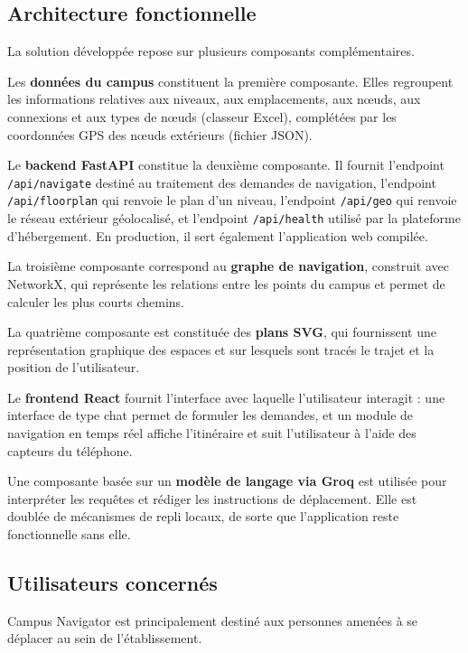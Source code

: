 \documentclass[12pt,a4paper]{report}
\begin{document}
\subsection{Architecture fonctionnelle}

La solution développée repose sur plusieurs composants complémentaires.

Les \textbf{données du campus} constituent la première composante. Elles regroupent les
informations relatives aux niveaux, aux emplacements, aux nœuds, aux connexions et aux types de
nœuds (classeur Excel), complétées par les coordonnées GPS des nœuds extérieurs (fichier JSON).

Le \textbf{backend FastAPI} constitue la deuxième composante. Il fournit l'endpoint
\texttt{/api/navigate} destiné au traitement des demandes de navigation, l'endpoint
\texttt{/api/floorplan} qui renvoie le plan d'un niveau, l'endpoint \texttt{/api/geo} qui
renvoie le réseau extérieur géolocalisé, et l'endpoint \texttt{/api/health} utilisé par la
plateforme d'hébergement. En production, il sert également l'application web compilée.

La troisième composante correspond au \textbf{graphe de navigation}, construit avec NetworkX, qui
représente les relations entre les points du campus et permet de calculer les plus courts
chemins.

La quatrième composante est constituée des \textbf{plans SVG}, qui fournissent une
représentation graphique des espaces et sur lesquels sont tracés le trajet et la position de
l'utilisateur.

Le \textbf{frontend React} fournit l'interface avec laquelle l'utilisateur interagit : une
interface de type chat permet de formuler les demandes, et un module de navigation en temps réel
affiche l'itinéraire et suit l'utilisateur à l'aide des capteurs du téléphone.

Une composante basée sur un \textbf{modèle de langage via Groq} est utilisée pour interpréter
les requêtes et rédiger les instructions de déplacement. Elle est doublée de mécanismes de repli
locaux, de sorte que l'application reste fonctionnelle sans elle.

\subsection{Utilisateurs concernés}

Campus Navigator est principalement destiné aux personnes amenées à se déplacer au sein de
l'établissement.
\end{document}
